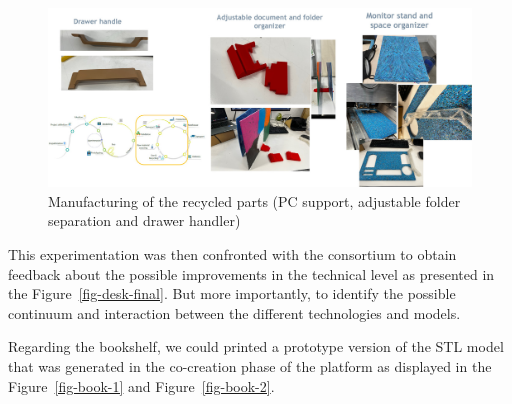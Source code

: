 \documentclass[
  11pt,
]{article}
\begin{document}
\begin{figure}[H]

{\centering \includegraphics{figures/demos/desk/desk-03.jpg}

}

\caption{\label{fig-uninova-01}Manufacturing of the recycled parts (PC
support, adjustable folder separation and drawer handler)}

\end{figure}

This experimentation was then confronted with the consortium to obtain
feedback about the possible improvements in the technical level as
presented in the Figure~\ref{fig-desk-final}. But more importantly, to
identify the possible continuum and interaction between the different
technologies and models.

Regarding the bookshelf, we could printed a prototype version of the STL
model that was generated in the co-creation phase of the platform as
displayed in the Figure~\ref{fig-book-1} and Figure~\ref{fig-book-2}.
\end{document}
